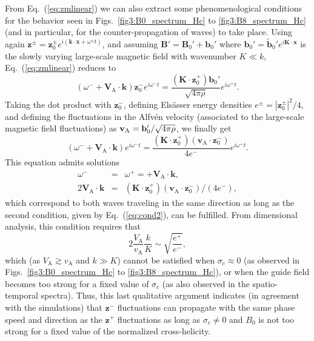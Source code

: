 \documentclass[aip,pop,reprint,amsmath,amssymb,floatfix]{revtex4-1}
\renewcommand{\vec}[1]{\mathbf{#1}}
\begin{document}
From Eq.~(\ref{eq:zmlinear}) we can also extract some phenomenological
conditions for the behavior seen in Figs.~\ref{fig3:B0_spectrum_Hc} to
\ref{fig3:B8_spectrum_Hc} (and in particular, for the
counter-propagation of waves) to take place. Using again
$\vec{z}^\pm = \vec{z}_0^\pm e^{i(\vec{k}\cdot \vec{x}+\omega^\pm
  t)}$, and assuming $\vec{B}' = \vec{B}_0' + \vec{b}_0'$ where
$\vec{b}_0' = \vec{\tilde{b}}_0'e^{i\vec{K} \cdot \vec{x}}$ is the
slowly varying large-scale magnetic field with wavenumber $K \ll k$,
Eq.~(\ref{eq:zmlinear}) reduces to
\begin{equation}
\left( \omega^- +\vec{V}_\textrm{A} \cdot \vec{k} \right) 
    \vec{z}_0^- e^{i \omega^- t} = 
    \frac{\left(\vec{K} \cdot \vec{z}_0^+\right) \vec{b}_0'}{\sqrt{4\pi \rho}} 
    e^{i \omega^+ t} .
\end{equation}
Taking the dot product with $\vec{z}_0^-$, defining Els\"asser energy
densities $e^\pm = |\vec{z}_0^\pm|^2/4$, and defining the fluctuations
in the Alfv\'en velocity (associated to the large-scale magnetic field
fluctuations) as ${\bf v}_\textrm{A} = \vec{b}_0'/\sqrt{4\pi \rho}$,
we finally get
\begin{equation}
\left( \omega^- + \vec{V}_\textrm{A} \cdot \vec{k} \right)
    e^{i \omega^- t} = 
    \frac{\left(\vec{K} \cdot \vec{z}_0^+\right)
    \left(\vec{v}_\textrm{A} \cdot \vec{z}_0^-\right)}
    {4e^-} 
    e^{i \omega^+ t} .
\end{equation}
This equation admits solutions
\begin{eqnarray}
    \omega^- &=& \omega^+ =
    + \vec{V}_\textrm{A} \cdot \vec{k}, 
    \label{eq:cond1} \\
    2 \vec{V}_\textrm{A} \cdot \vec{k} &=& 
    \left(\vec{K} \cdot \vec{z}_0^+\right)
    \left(\vec{v}_\textrm{A} \cdot \vec{z}_0^-\right) /
    (4e^-), \label{eq:cond2}
\end{eqnarray}
which correspond to both waves traveling in the same direction as long
as the second condition, given by Eq.~(\ref{eq:cond2}), can be
fulfilled. From dimensional analysis, this condition requires that
\begin{equation}
    2 \frac{V_\textrm{A}}{v_\textrm{A}} \frac{k}{K}
    \sim \sqrt{\frac{e^+}{e^-}},
\end{equation}
which (as $V_\textrm{A}\gtrsim v_\textrm{A}$ and $k\gg K$) cannot be
satisfied when $\sigma_c \approx 0$ (as observed in
Figs.~\ref{fig3:B0_spectrum_Hc} to \ref{fig3:B8_spectrum_Hc}), or when
the guide field becomes too strong for a fixed value of $\sigma_c$ (as also
observed in the spatio-temporal spectra). Thus, this last qualitative
argument indicates (in agreement with the simulations) that
$\vec{z}^-$ fluctuations can propagate with the same phase speed and
direction as the $\vec{z}^+$ fluctuations as long as $\sigma_c \neq 0$ and
$B_0$ is not too strong for a fixed value of the normalized cross-helicity.
\end{document}
